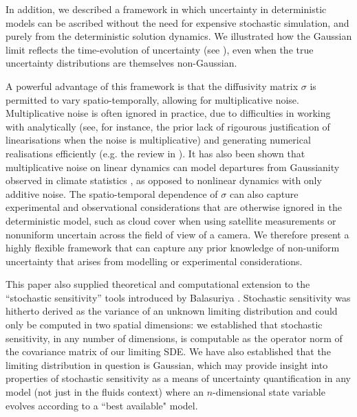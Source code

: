 In addition, we described a framework in which uncertainty in deterministic models can be ascribed without the need for expensive stochastic simulation, and purely from the deterministic solution dynamics.
We illustrated how the Gaussian limit reflects the time-evolution of uncertainty (see ), even when the true uncertainty distributions are themselves non-Gaussian.

A powerful advantage of this framework is that the diffusivity matrix \(\sigma\) is permitted to vary spatio-temporally, allowing for multiplicative noise.
Multiplicative noise is often ignored in practice, due to difficulties in working with analytically (see, for instance, the prior lack of rigourous justification of linearisations when the noise is multiplicative) and generating numerical realisations efficiently (e.g. the review in \cite{MoraEtAl_2017_StableNumericalScheme}).
It has also been shown that multiplicative noise on linear dynamics can model departures from Gaussianity observed in climate statistics \cite{SuraEtAl_2005_MultiplicativeNoiseNonGaussianity}, as opposed to nonlinear dynamics with only additive noise. 
The spatio-temporal dependence of \(\sigma\) can also capture experimental and observational considerations that are otherwise ignored in the deterministic model, such as cloud cover when using satellite measurements or nonuniform uncertain across the field of view of a camera.
We therefore present a highly flexible framework that can capture any prior knowledge of non-uniform uncertainty that arises from modelling or experimental considerations.

This paper also supplied theoretical and computational extension to the ``stochastic sensitivity'' tools introduced by Balasuriya \cite{Balasuriya_2020_StochasticSensitivityComputable}.
Stochastic sensitivity was hitherto derived as the variance of an unknown limiting distribution and could only be computed in two spatial dimensions: we established that stochastic sensitivity, in any number of dimensions, is computable as the operator norm of the covariance matrix of our limiting SDE. 
We have also established that the limiting distribution in question is Gaussian, which may provide insight into properties of stochastic sensitivity as a means of uncertainty quantification in any model (not just in the fluids context) where an $ n $-dimensional state variable evolves according to a ``best available" model.


